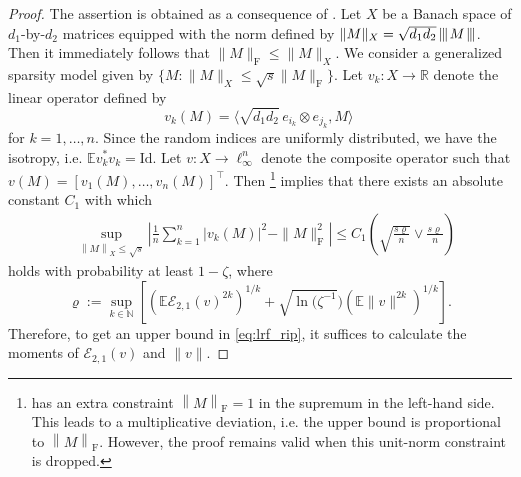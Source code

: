 \documentclass[11pt]{article}
\newcommand{\xspace}{\hbox{\kern-2.5pt}}
\newcommand\tnorm[1]{\left\vert\xspace\left\vert\xspace\left\vert\mskip2mu
#1\mskip2mu \right\vert\xspace\right\vert\xspace\right\vert}
\newcommand{\norm}[1]{\left \|#1 \right \|}
\begin{document}
\begin{proof}
The assertion is obtained as a consequence of \cite[Proposition~2.6]{junge2020generalized}. 
Let $X$ be a Banach space of $d_1$-by-$d_2$ matrices equipped with the norm defined by $\|M\|_X = \sqrt{d_1 d_2} \tnorm{M}$. 
Then it immediately follows that $\|M\|_\mathrm{F} \leq \|M\|_X$. 
We consider a generalized sparsity model given by $\{M: \|M\|_X \leq \sqrt{s} \|M\|_\mathrm{F} \}$. 
Let $v_k: X \to \mathbb{R}$ denote the linear operator defined by
\[
v_k(M) = \langle \sqrt{d_1d_2} \, e_{i_k} \otimes e_{j_k}, M \rangle\,
\]
for $k = 1,\dots,n$. 
Since the random indices are uniformly distributed, we have the isotropy, i.e. $\mathbb{E} v_k^* v_k = \mathrm{Id}$. 
Let $v: X \to \ell_\infty^n$ denote the composite operator such that $v(M) = [v_1(M), \dots, v_n(M)]^\top$. 
Then \cite[Proposition~2.6]{junge2020generalized}\footnote{\cite[Proposition~2.6]{junge2020generalized} has an extra constraint $\norm{M}_\mathrm{F} = 1$ in the supremum in the left-hand side. This leads to a multiplicative deviation, i.e. the upper bound is proportional to $\norm{M}_\mathrm{F}$. However, the proof remains valid when this unit-norm constraint is dropped.} implies that there exists an absolute constant $C_1$ with which 
\begin{equation}
\label{eq:lrf_rip2}
\begin{aligned}
& \sup_{
\norm{M}_X \leq \sqrt{s} 
} 
\left| \frac{1}{n} \sum_{k=1}^n |v_k(M)|^2 - \|M\|_\mathrm{F}^2 \right| \leq C_1 \left( \sqrt{\frac{s \varrho}{n}} \vee \frac{s \varrho}{n}\right) 
\end{aligned}
\end{equation}
holds with probability at least $1-\zeta$, where
\[
\varrho := \sup_{k \in \mathbb{N}} \left[(\mathbb{E} \mathcal{E}_{2,1}(v)^{2k})^{1/k} + \sqrt{\ln(\zeta^{-1}}) (\mathbb{E} \|v\|^{2k})^{1/k}\right].
\]
Therefore, to get an upper bound in \eqref{eq:lrf_rip}, it suffices to calculate the moments of $\mathcal{E}_{2,1}(v)$ and $\|v\|$. 


\end{proof}
\end{document}
